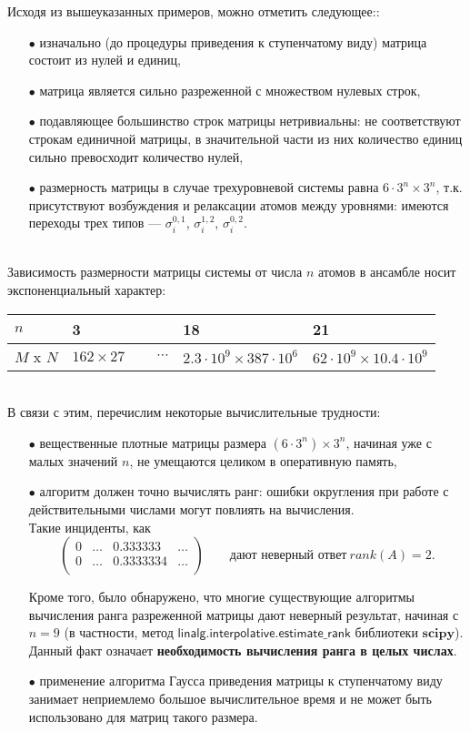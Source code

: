 \clearpage
\indent Исходя из вышеуказанных примеров, можно отметить следующее::
\begin{itemize}
	\item[$\bullet$]{изначально (до процедуры приведения к ступенчатому виду) матрица состоит из нулей и единиц,}
	\item[$\bullet$]{матрица является сильно разреженной с множеством нулевых строк,}
	\item[$\bullet$]{подавляющее большинство строк матрицы нетривиальны: не соответствуют строкам единичной матрицы, в значительной части из них количество единиц сильно превосходит количество нулей,}
	\item[$\bullet$]{размерность матрицы в случае трехуровневой системы равна $6 \cdot 3^{n} \times 3^{n}$, т.к. присутствуют возбуждения и релаксации атомов между уровнями: имеются переходы трех типов --- $\sigma^{0,1}_i$, $\sigma^{1,2}_i$,
		$\sigma^{0,2}_i$.}
\end{itemize}
\
\\[0pt]
\indent Зависимость размерности матрицы системы от числа $n$ атомов в ансамбле носит экспоненциальный характер:

\noindent\begin{tabular}[t]{|p{4em}|p{5em}|p{4em}|p{9em}|p{9em}|}
	\hline
	$n$ & 3 &  & 18 & 21 \\
	\hline
	$M$ x $N$ & $162 \times 27$ & $\quad~\cdots$ & $2.3 \cdot 10^9 \times 387 \cdot 10^6$ & $62 \cdot 10^9 \times 10.4 \cdot 10^9$ \\
	\hline
\end{tabular}
\
\\[12pt]

В связи с этим, перечислим некоторые вычислительные трудности:
\begin{itemize}
	\item[$\bullet$]{вещественные плотные матрицы размера $(6 \cdot 3^{n}) \times 3^{n}$, начиная уже с малых значений $n$, не умещаются целиком в оперативную память,}
	\item[$\bullet$]{алгоритм должен точно вычислять ранг: ошибки округления при работе с действительными числами могут повлиять на вычисления.\\
		Такие инциденты, как
		\[
		\begin{pmatrix}
			0 & \dots & 0.333333 & \dots \\
			0 & \dots & 0.3333334 & \dots \\
		\end{pmatrix}\qquad\text{дают неверный ответ}~rank(A) = 2.
		\]}
	
	Кроме того, было обнаружено, что многие существующие алгоритмы вычисления
	ранга разреженной матрицы дают неверный результат, начиная с $n = 9$ (в частности, метод $\mathsf{linalg.interpolative.estimate\_rank}$ библиотеки $\mathbf{scipy}$). Данный факт означает \textbf{необходимость вычисления ранга в целых числах}.
	\item[$\bullet$]{применение алгоритма Гаусса приведения матрицы к ступенчатому виду занимает неприемлемо большое вычислительное время и не может быть использовано для матриц такого размера}.
\end{itemize}

